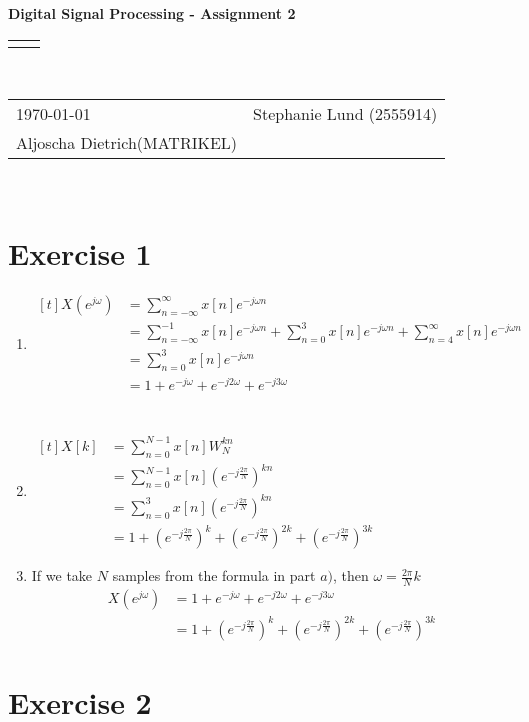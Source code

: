 \documentclass[12pt]{article}
\renewcommand{\title}[1]{\textbf{#1}\\}
\renewcommand{\line}{\begin{tabularx}{\textwidth}{X>{\raggedleft}X}\hline\\\end{tabularx}\\[-0.5cm]}
\newcommand{\leftright}[2]{\begin{tabularx}{\textwidth}{X>{\raggedleft}X}#1%
& #2\\\end{tabularx}\\[-0.5cm]}
\begin{document}
\title{Digital Signal Processing - Assignment 2}
\line
\leftright{\today}{Stephanie Lund (2555914)\\Aljoscha Dietrich(MATRIKEL)} %

\section*{Exercise 1}

\begin{enumerate}[label=\alph*)]
\item 
$\begin{aligned}[t]
X(e^{j\omega}) &= \sum_{n=-\infty}^{\infty} x[n]e^{-j\omega n}\\
&= \sum_{n=-\infty}^{-1} x[n]e^{-j\omega n} + \sum_{n=0}^{3} x[n]e^{-j\omega n} + \sum_{n=4}^{\infty} x[n]e^{-j\omega n} \\
&=  \sum_{n=0}^{3} x[n]e^{-j\omega n} \\
&= 1 + e^{-j\omega} + e^{-j2\omega} + e^{-j3\omega}\\
\end{aligned}$
\\ \\
\item 
$\begin{aligned}[t]
X[k] &= \sum_{n=0}^{N-1} x[n]W_{N}^{kn}\\
&= \sum_{n=0}^{N-1} x[n](e^{-j\frac{2\pi}{N}})^{kn} \\
&= \sum_{n=0}^{3} x[n] (e^{-j\frac{2\pi}{N}})^{kn} \\
&= 1 + (e^{-j\frac{2\pi}{N}})^{k} + (e^{-j\frac{2\pi}{N}})^{2k} + (e^{-j\frac{2\pi}{N}})^{3k}
\end{aligned}$

\item If we take $N$ samples from the formula in part $a)$, then $\omega = \frac{2\pi}{N}k$
\begin{align*}
X(e^{j\omega}) &= 1 + e^{-j\omega} + e^{-j2\omega} + e^{-j3\omega}\\
&= 1 + (e^{-j\frac{2\pi}{N}})^{k} + (e^{-j\frac{2\pi}{N}})^{2k} + (e^{-j\frac{2\pi}{N}})^{3k}
\end{align*}

\end{enumerate}

\section*{Exercise 2}
\end{document}
